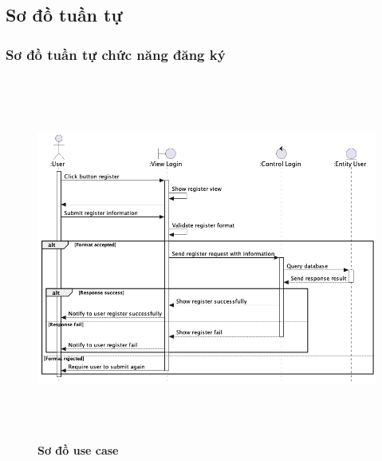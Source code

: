 \documentclass{article}%
\begin{document}
\subsection{Sơ đồ tuần tự}
\subsubsection{Sơ đồ tuần tự chức năng đăng ký}
    \begin{figure}[H]
         \centering
         \includegraphics[width=16cm,height=12cm]{Images/mobile_app/register.png}
         \caption[Sơ đồ use case]{\bfseries \fontsize{12pt}{0pt}
         \selectfont Sơ đồ use case}
         \label{hinh21} %
    \end{figure}
\end{document}
